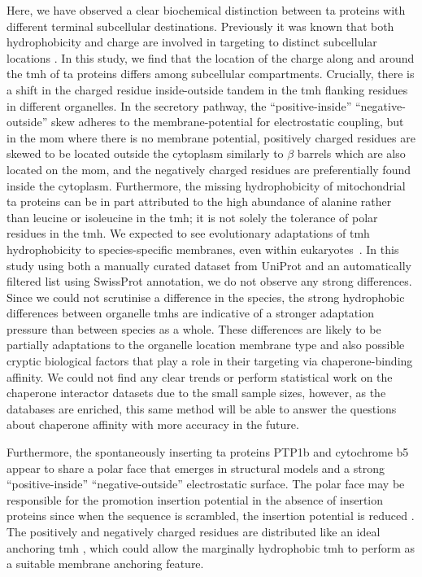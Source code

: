 Here, we have observed a clear biochemical distinction between \gls{ta} proteins with different terminal subcellular destinations.
Previously it was known that both hydrophobicity and charge are involved in targeting to distinct subcellular locations \cite{Costello2017}.
In this study, we find that the location of the charge along and around the \gls{tmh} of \gls{ta} proteins differs among subcellular compartments.
Crucially, there is a shift in the charged residue inside\--outside tandem in the \gls{tmh} flanking residues in different organelles.
In the secretory pathway, the ``positive\--inside'' ``negative\--outside'' skew adheres to the membrane\--potential for electrostatic coupling, but in the \gls{mom} where there is no membrane potential, positively charged residues are skewed to be located outside the cytoplasm similarly to $\beta$ barrels \cite{Pogozheva2013} which are also located on the \gls{mom}, and the negatively charged residues are preferentially found inside the cytoplasm.
Furthermore, the missing hydrophobicity of mitochondrial \gls{ta} proteins can be in part attributed to the high abundance of alanine rather than leucine or isoleucine in the \gls{tmh}; it is not solely the tolerance of polar residues in the \gls{tmh}.
We expected to see evolutionary adaptations of \gls{tmh} hydrophobicity to species-specific membranes, even within eukaryotes~\cite{Baker2017, Sharpe2010}.
In this study using both a manually curated dataset from UniProt and an automatically filtered list using SwissProt annotation, we do not observe any strong differences.
Since we could not scrutinise a difference in the species, the strong hydrophobic differences between organelle \gls{tmh}s are indicative of a stronger adaptation pressure than between species as a whole.
These differences are likely to be partially adaptations to the organelle location membrane type and also possible cryptic biological factors that play a role in their targeting via chaperone\--binding affinity.
We could not find any clear trends or perform statistical work on the chaperone interactor datasets due to the small sample sizes, however, as the databases are enriched, this same method will be able to answer the questions about chaperone affinity with more accuracy in the future.

Furthermore, the spontaneously inserting \gls{ta} proteins PTP1b and cytochrome b5 appear to share a polar face that emerges in structural models and a strong ``positive\--inside'' ``negative\--outside'' electrostatic surface.
The polar face may be responsible for the promotion insertion potential in the absence of insertion proteins since when the sequence is scrambled, the insertion potential is reduced \cite{Brambillasca2006}.
The positively and negatively charged residues are distributed like an ideal anchoring \gls{tmh} \cite{Baker2017}, which could allow the marginally hydrophobic \gls{tmh} to perform as a suitable membrane anchoring feature.
